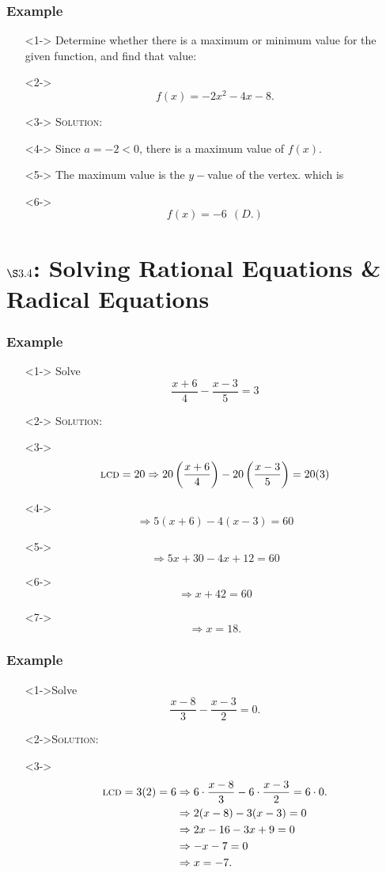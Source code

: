 \documentclass[handout]{beamer}
\begin{document}
\begin{frame}
	\frametitle{Example}
	\begin{enumerate}
		\item[]<1-> Determine whether there is a maximum or minimum value for the given function, and find that value: 
		\item[]<2-> \[ f(x)=-2x^{2}-4x-8. \]
		\item[]<3-> \textsc{Solution:} 
		\item[]<4-> Since $a=-2<0$, there is a maximum value of $f(x)$.  
		\item[]<5-> The maximum value is the $y-$value of the vertex. which is 
		\item[]<6-> \[ f(x)=-6~~(D.)\]
	\end{enumerate}
\end{frame}

\section{$\S 3.4$: Solving Rational Equations \& Radical Equations}

\begin{frame}
	\frametitle{Example} 
	\begin{enumerate}
		\item[]<1-> Solve 
		\[
			\frac{x+6}{4}-\frac{x-3}{5}=3
		\]
		\item[]<2-> \textsc{Solution:}   
		\item[]<3-> \[ \text{\textsc{lcd}}=20 \Rightarrow 20 \left( \frac{x+6}{4}\right)-20\left(\frac{x-3}{5}\right)=20(3)\] 
		\item[]<4-> \[ \Rightarrow 5(x+6)-4(x-3)=60 \] 
		\item[]<5-> \[ \Rightarrow 5x+30-4x+12=60 \]
		\item[]<6-> \[ \Rightarrow x+42=60  \]
		\item[]<7-> \[ \Rightarrow x=18.  \]
	\end{enumerate}
\end{frame}

\begin{frame}
	\frametitle{Example}
	\begin{enumerate}
		\item[]<1->Solve 
		\[
			\frac{x-8}{3}-\frac{x-3}{2}=0. 
		\]
		\item[]<2->\textsc{Solution:} 
		\item[]<3-> 
		\begin{align*}
			\text{\textsc{lcd}}=3(2)=6 & \Rightarrow 6 \cdot \frac{x-8}{3}- 6 \cdot \frac{x-3}{2}= 6 \cdot 0.  \\
			& \Rightarrow 2(x-8)-3(x-3)=0 \\
			& \Rightarrow 2x-16-3x+9=0 \\
			& \Rightarrow -x-7=0 \\
			& \Rightarrow x=-7. 
		\end{align*}
	\end{enumerate}
\end{frame}
\end{document}
